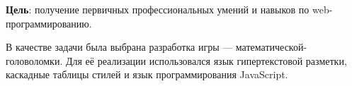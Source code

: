 

\textbf{Цель}: получение первичных профессиональных умений и навыков по web-про\-грам\-ми\-ро\-ва\-нию.

В качестве задачи была выбрана разработка игры --- математической-головоломки. Для её реализации использовался язык гипертекстовой разметки, каскадные таблицы стилей и язык программирования JavaScript.

\pagebreak

